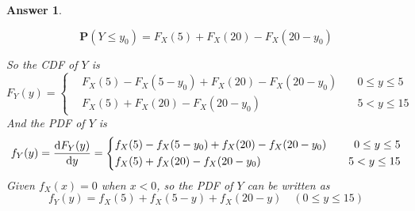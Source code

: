 \documentclass[utf8]{article}
\theoremstyle{definition}%
\theoremstyle{plain}%
\newtheorem{answer}{Answer} %
\begin{document}
\begin{answer}
\begin{enumerate}[label=(\alph*)]
            \begin{equation}
                \mathbf{P}(Y \leq y_0) = F_{X}(5) + F_{X}(20) - F_{X}(20-y_0)
            \end{equation}
    \end{enumerate}
    So the CDF of $Y$ is 
    \begin{equation}
        F_{Y}(y) = \left\{\begin{aligned}
            &F_{X}(5) - F_{X}(5-y_0) + F_{X}(20) - F_{X}(20-y_0) \quad &0 \leq y \leq 5 \\
            &F_{X}(5) + F_{X}(20) - F_{X}(20-y_0) \quad &5 < y \leq 15
        \end{aligned}\right.
    \end{equation}
    And the PDF of $Y$ is
    \begin{equation}
        f_{Y}(y) = \dv{F_{Y}(y)}{y} = \left\{\begin{aligned}
            &f_{X}(5) - f_{X}(5-y_0) + f_{X}(20) - f_{X}(20-y_0) \quad &0 \leq y \leq 5 \\
            &f_{X}(5) + f_{X}(20) - f_{X}(20-y_0) \quad &5 < y \leq 15
        \end{aligned}\right.
    \end{equation}
    Given $f_{X}(x) = 0$ when $x < 0$, so the PDF of $Y$ can be written as
    \begin{equation}
        f_{Y}(y) = f_{X}(5) + f_{X}(5-y) + f_{X}(20-y) \quad (0 \leq y \leq 15)
    \end{equation}
\end{answer}
\end{document}
